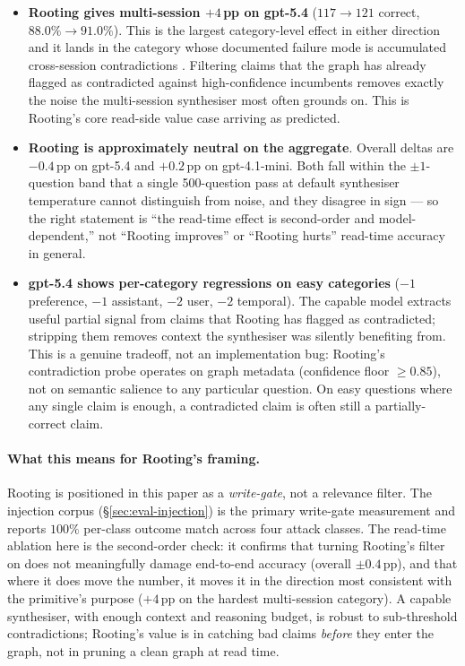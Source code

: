 \documentclass[10pt,a4paper]{article}
\begin{document}
\begin{itemize}[leftmargin=*,topsep=2pt,itemsep=2pt]
\item \textbf{Rooting gives multi-session $+4$\,pp on gpt-5.4} ($117
\to 121$ correct, $88.0\% \to 91.0\%$). This is the largest
category-level effect in either direction and it lands in the
category whose documented failure mode is accumulated cross-session
contradictions \cite{evolvingmemory2026}. Filtering claims that the
graph has already flagged as contradicted against high-confidence
incumbents removes exactly the noise the multi-session synthesiser
most often grounds on. This is Rooting's core read-side value case
arriving as predicted.

\item \textbf{Rooting is approximately neutral on the aggregate}.
Overall deltas are $-0.4$\,pp on gpt-5.4 and $+0.2$\,pp on
gpt-4.1-mini. Both fall within the $\pm 1$-question band that a single
500-question pass at default synthesiser temperature cannot
distinguish from noise, and they disagree in sign --- so the right
statement is ``the read-time effect is second-order and
model-dependent,'' not ``Rooting improves'' or ``Rooting hurts''
read-time accuracy in general.

\item \textbf{gpt-5.4 shows per-category regressions on easy
categories} ($-1$ preference, $-1$ assistant, $-2$ user, $-2$
temporal). The capable model extracts useful partial signal from
claims that Rooting has flagged as contradicted; stripping them
removes context the synthesiser was silently benefiting from. This
is a genuine tradeoff, not an implementation bug: Rooting's
contradiction probe operates on graph metadata (confidence floor
$\geq 0.85$), not on semantic salience to any particular question.
On easy questions where any single claim is enough, a contradicted
claim is often still a partially-correct claim.
\end{itemize}

\paragraph{What this means for Rooting's framing.}
Rooting is positioned in this paper as a \emph{write-gate}, not a
relevance filter. The injection corpus (\S\ref{sec:eval-injection}) is
the primary write-gate measurement and reports $100\%$ per-class
outcome match across four attack classes. The read-time ablation here
is the second-order check: it confirms that turning Rooting's filter
on does not meaningfully damage end-to-end accuracy (overall
$\pm 0.4$\,pp), and that where it does move the number, it moves it
in the direction most consistent with the primitive's purpose ($+4$\,pp
on the hardest multi-session category). A capable synthesiser,
with enough context and reasoning budget, is robust to sub-threshold
contradictions; Rooting's value is in catching bad claims
\emph{before} they enter the graph, not in pruning a clean graph at
read time.
\end{document}
